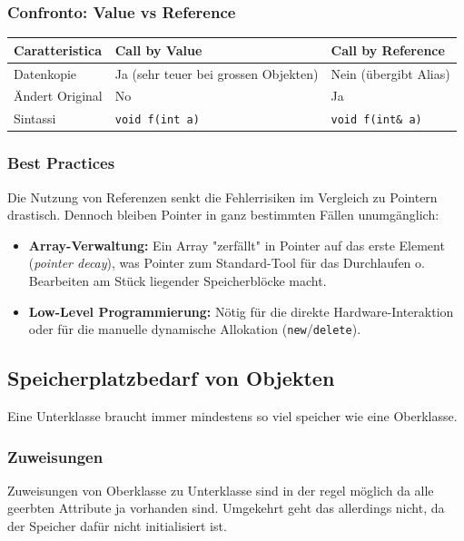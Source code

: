 \subsubsection{Confronto: Value vs Reference}
\begin{center}
\begin{tabular}{@{}lll@{}}
\toprule
\textbf{Caratteristica} & \textbf{Call by Value} & \textbf{Call by Reference} \\ \midrule
Datenkopie          & Ja (sehr teuer bei grossen Objekten) & Nein (übergibt Alias) \\
Ändert Original      & No                             & Ja \\
Sintassi                & \texttt{void f(int a)}         & \texttt{void f(int\& a)} \\ \bottomrule
\end{tabular}
\end{center}

\subsubsection{Best Practices}
Die Nutzung von Referenzen senkt die Fehlerrisiken im Vergleich zu Pointern drastisch.
Dennoch bleiben Pointer in ganz bestimmten Fällen unumgänglich:
\begin{itemize}
    \item \textbf{Array-Verwaltung:} Ein Array "zerfällt" in Pointer auf das erste Element (\textit{pointer decay}), was Pointer zum Standard-Tool für das Durchlaufen o. Bearbeiten am Stück liegender Speicherblöcke macht.
    \item \textbf{Low-Level Programmierung:} Nötig für die direkte Hardware-Interaktion oder für die manuelle dynamische Allokation (\texttt{new}/\texttt{delete}).
\end{itemize}



\subsection{Speicherplatzbedarf von Objekten}

Eine Unterklasse braucht immer mindestens so viel speicher wie eine Oberklasse. 
\subsubsection{Zuweisungen}

Zuweisungen von Oberklasse zu Unterklasse sind in der regel möglich da alle geerbten Attribute ja vorhanden sind. 
Umgekehrt geht das allerdings nicht, da der Speicher dafür nicht initialisiert ist. 
